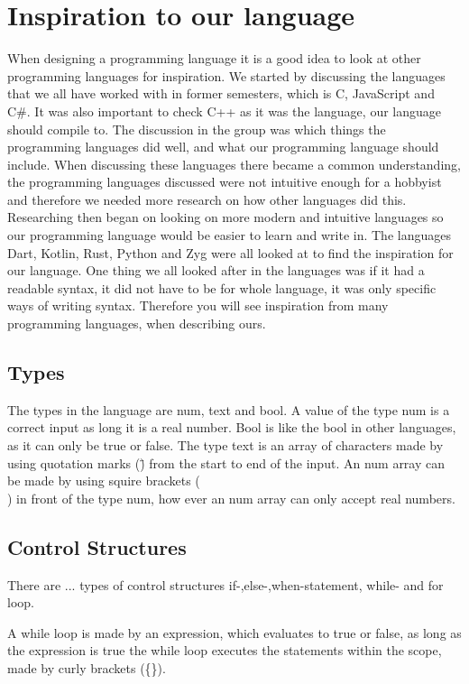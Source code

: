 \section{Inspiration to our language}
When designing a programming language it is a good idea to look at other programming languages for inspiration. We started by discussing the languages that we all have worked with in former semesters, which is C, JavaScript and C\#. It was also important to check C++ as it was the language, our language should compile to. The discussion in the group was which things the programming languages did well, and what our programming language should include. When discussing these languages there became a common understanding, the programming languages discussed were not intuitive enough for a hobbyist and therefore we needed more research on how other languages did this. Researching then began on looking on more modern and intuitive languages so our programming language would be easier to learn and write in. The languages Dart, Kotlin, Rust, Python and Zyg were all looked at to find the inspiration for our language. One thing we all looked after in the languages was if it had a readable syntax, it did not have to be for whole language, it was only specific ways of writing syntax. Therefore you will see inspiration from many programming languages, when describing ours.  



\subsection{Types}
The types in the language are num, text and bool. A value of the type num is a correct input as long it is a real number. Bool is like the bool in other languages, as it can only be true or false. The type text is an array of characters made by using quotation marks (\") from the start to end of the input. An num array can be made by using squire brackets (\[\]) in front of the type num, how ever an num array can only accept real numbers.

\subsection{Control Structures}
There are ... types of control structures if-,else-,when-statement, while- and for loop. 

A while loop is made by an expression, which evaluates to true or false, as long as the expression is true the while loop executes the statements within the scope, made by curly brackets (\{\}).
